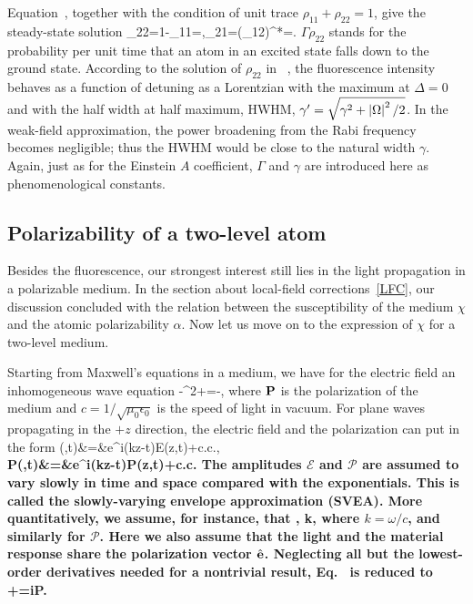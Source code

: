 Equation~, together with the condition of unit trace $\rho_{11}+\rho_{22}=1$, give the steady-state solution
\bea
\rho_{22}=1-\rho_{11}=,\quad\rho_{21}=(\rho_{12})^*=.
\label{STEADY_STATE}
\eea
$\Gamma\rho_{22}$ stands for the probability per unit time that an atom in an excited state falls down to the ground state. According to the solution of $\rho_{22}$ in ~, the fluorescence intensity behaves as a function of detuning as a Lorentzian with the maximum at $\Delta=0$ and with the half width at half maximum, HWHM, $\gamma^\prime=\sqrt{\gamma^2+\left| \Omega \right|^2/2}$.  In the weak-field approximation, the power broadening from the Rabi frequency becomes negligible; thus the HWHM would be close to the natural width $\gamma$. Again, just as for the Einstein $A$ coefficient, $\Gamma$  and $\gamma$ are introduced here as phenomenological constants.

\subsection{Polarizability of a two-level atom}
Besides the fluorescence, our strongest interest still lies in the light propagation in a polarizable medium. In the section about local-field corrections~\ref{LFC}, our discussion concluded with the relation between the susceptibility of the medium $\chi$ and the atomic polarizability $\alpha$. Now let us move on to the expression of $\chi$ for a two-level medium.

Starting from Maxwell's equations in a medium, we have for the electric field an inhomogeneous wave equation
\bea
-\nabla^2\bE+=-,
\label{WAVE_EQ}
\eea
where $\bf P$ is the polarization of the medium and $c=1/\sqrt{\mu_0\epsilon_0}$ is the speed of light in vacuum. For plane waves propagating in the $+z$ direction, the electric field and the polarization can put in the form
\bea
\bE(\br,t)&=&e^{i(kz-\omega t)}\mathcal E(z,t)+{\rm c.c}.,\\
\bf P(\br,t)&=&e^{i(kz-\omega t)}\mathcal P(z,t)+{\rm c.c.}
\eea
The amplitudes $\mathcal E$ and $\mathcal P$ are assumed to vary slowly in time and space compared with the exponentials. This is called the slowly-varying envelope approximation (SVEA). More quantitatively, we assume, for  instance, that
\bea
{}\ll \omega{}, \quad {}\ll k, 
\eea
where $k=\omega/c$, and similarly for $\mathcal P$. Here we also assume that the light and the material response share the polarization vector $\hat{\bf e}$. Neglecting all but the lowest-order derivatives needed for a nontrivial result, Eq.~ is reduced to 
\bea
{}+=i\mathcal P.
\label{BASIC_EQ}
\eea

